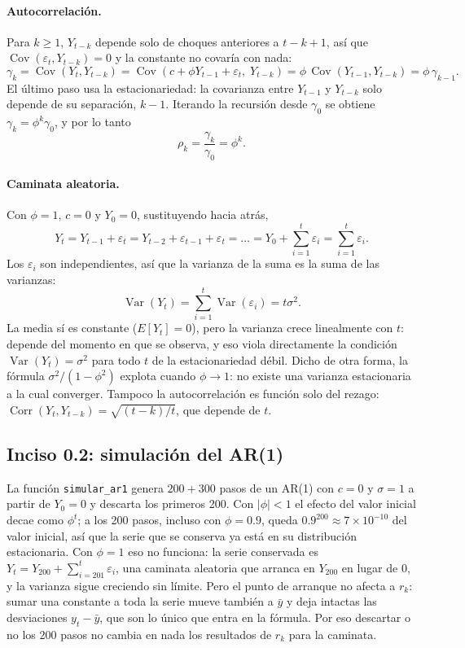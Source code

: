 \paragraph{Autocorrelación.} Para $k\geq 1$, $Y_{t-k}$ depende solo de choques
anteriores a $t-k+1$, así que $\operatorname{Cov}(\varepsilon_t, Y_{t-k})=0$ y
la constante no covaría con nada:
\[
  \gamma_k = \operatorname{Cov}(Y_t, Y_{t-k})
  = \operatorname{Cov}(c + \phi Y_{t-1} + \varepsilon_t,\; Y_{t-k})
  = \phi\,\operatorname{Cov}(Y_{t-1}, Y_{t-k})
  = \phi\,\gamma_{k-1}.
\]
El último paso usa la estacionariedad: la covarianza entre $Y_{t-1}$ y
$Y_{t-k}$ solo depende de su separación, $k-1$. Iterando la recursión desde
$\gamma_0$ se obtiene $\gamma_k = \phi^k\gamma_0$, y por lo tanto
\[
  \rho_k = \frac{\gamma_k}{\gamma_0} = \phi^k .
\]

\paragraph{Caminata aleatoria.} Con $\phi=1$, $c=0$ y $Y_0=0$, sustituyendo
hacia atrás,
\[
  Y_t = Y_{t-1} + \varepsilon_t = Y_{t-2} + \varepsilon_{t-1} + \varepsilon_t
  = \dots = Y_0 + \sum_{i=1}^{t}\varepsilon_i = \sum_{i=1}^{t}\varepsilon_i .
\]
Los $\varepsilon_i$ son independientes, así que la varianza de la suma es la
suma de las varianzas:
\[
  \operatorname{Var}(Y_t) = \sum_{i=1}^{t}\operatorname{Var}(\varepsilon_i)
  = t\sigma^2 .
\]
La media sí es constante ($E[Y_t]=0$), pero la varianza crece linealmente con
$t$: depende del momento en que se observa, y eso viola directamente la
condición $\operatorname{Var}(Y_t)=\sigma^2$ para todo $t$ de la
estacionariedad débil. Dicho de otra forma, la fórmula
$\sigma^2/(1-\phi^2)$ explota cuando $\phi\to 1$: no existe una varianza
estacionaria a la cual converger. Tampoco la autocorrelación es función solo
del rezago: $\operatorname{Corr}(Y_t,Y_{t-k}) = \sqrt{(t-k)/t}$, que depende
de $t$.

\subsection{Inciso 0.2: simulación del AR(1)}

La función \texttt{simular\_ar1} genera $200+300$ pasos de un AR(1) con $c=0$
y $\sigma=1$ a partir de $Y_0=0$ y descarta los primeros 200. Con $|\phi|<1$
el efecto del valor inicial decae como $\phi^t$; a los 200 pasos, incluso con
$\phi=0.9$, queda $0.9^{200}\approx 7\times10^{-10}$ del valor inicial, así
que la serie que se conserva ya está en su distribución estacionaria. Con
$\phi=1$ eso no funciona: la serie conservada es $Y_t = Y_{200} +
\sum_{i=201}^{t}\varepsilon_i$, una caminata aleatoria que arranca en
$Y_{200}$ en lugar de 0, y la varianza sigue creciendo sin límite. Pero el
punto de arranque no afecta a $r_k$: sumar una constante a toda la serie mueve
también a $\bar y$ y deja intactas las desviaciones $y_t-\bar y$, que son lo
único que entra en la fórmula. Por eso descartar o no los 200 pasos no cambia
en nada los resultados de $r_k$ para la caminata.

